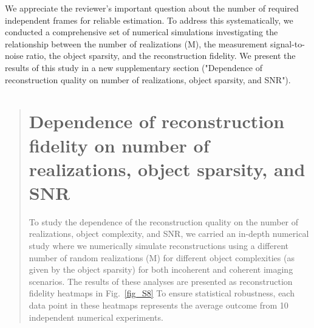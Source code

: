\documentclass[12pt]{article}
\newenvironment{finished_ourresponse}
    {\begin{tcolorbox}[width=\linewidth,breakable,enhanced,colback=gray!5,colframe=finished_responsecolor!50,title=Response,left=5pt,right=5pt]}
    {\end{tcolorbox}}
\begin{document}
\begin{finished_ourresponse}
    We appreciate the reviewer's important question about the number of required independent frames for reliable estimation. To address this systematically, we conducted a comprehensive set of numerical simulations investigating the relationship between the number of realizations (M), the measurement signal-to-noise ratio, the object sparsity, and the reconstruction fidelity. We present the results of this study in a new supplementary section ("Dependence of reconstruction quality on number of realizations, object sparsity, and SNR").

    \begin{quote} {\bfseries
        \setcounter{section}{5}
        \section{Dependence of reconstruction fidelity on number of realizations, object sparsity, and SNR}

        To study the dependence of the reconstruction quality on the number of realizations, object complexity, and SNR, we carried an in-depth numerical study where we numerically simulate reconstructions using a different number of random realizations (M) for different object complexities (as given by the object sparsity) for both incoherent and coherent imaging scenarios.
        The results of these analyses are presented as reconstruction fidelity heatmaps in Fig.~\ref{fig_S8}
        To ensure statistical robustness, each data point in these heatmaps represents the average outcome from 10 independent numerical experiments.

}
\end{quote}
\end{finished_ourresponse}
\end{document}
